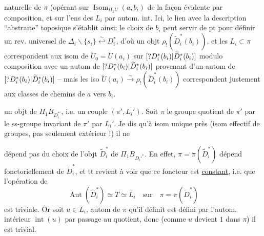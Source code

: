 
naturelle de \(\pi\) (opérant sur \(\operatorname{Isom}_{\Pi_1U}(a,b_i)\) de la façon évidente par composition, et sur l'ens des \(L_i\) par autom. int.
 Ici, le  lien avec la description ``abstraite'' toposique s'établit ainsi: le choix de \(b_i\) peut servir de pt  pour définir un rev. universel de \(\Delta_i\smallsetminus\{s_i\}\overset{\sim}{\hookleftarrow}D_i^*\), d'où un objt \(\rho_!(\widetilde D_i^*(b_i))\), et  les \(L_i\subset\pi\) correspondent  aux isom de \(\widetilde U_0=\widetilde U(a_i)\) sur \([?D_i^*(b_i)|\widetilde D_i^*(b_i)]\) modulo composition avec un autom de \([?D_i^*(b_i)|\widetilde D_i^*(b_i)]\) provenant d'un autom de \([?D_i^*(b_i)|\widetilde D_i^*(b_i)]\) -- mais les iso  \(\widetilde U(a_i)\xrightarrow{\sim}\rho_!(\widetilde D_i^*(b_i))\) correspondent justement aux classes de chemins de \(a\) vers \(b_i\).

 un objt de \(\Pi_1B_{D_i^{*'}}\), i.e. un couple \((\pi',L_i')\). Soit \(\pi\) le groupe quotient de \(\pi'\) par le ss-groupe invariant de \(\pi'\)   par \(L_i'\). Je dis \margin{\(\Vert\)} qu'à isom unique près (isom effectif de groupes, pas seulement extérieur !) il ne


dépend pas du choix de l'objt \(\widetilde D_i^*\) de \(\Pi_1B_{D_i'^*}\). En effet, \(\pi=\pi(\widetilde D_i^*)\) dépend fonctoriellement de \(\widetilde D_i^*\), et tt revient à voir que ce foncteur est \uline{constant}, i.e. que l'opération de
\[
\operatorname{Aut}(\widetilde D_i^*)\simeq T\simeq L_i
\quad\text{sur}\quad
\pi=\pi(\widetilde D_i^*)
\]
est triviale. Or soit \(u\in L_i\),  autom de \(\pi\) qu'il définit est défini par l'autom. intérieur \(\operatorname{int}(u)\) par passage au quotient, donc (comme \(u\) devient \(1\) dans \(\pi\)) il est trivial. 

